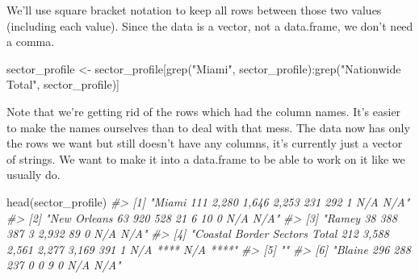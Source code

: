 \documentclass[
]{krantz}
\makeatletter
\newenvironment{Shaded}{\begin{snugshade}}{\end{snugshade}}
\newcommand{\CommentTok}[1]{\textcolor[rgb]{0.37,0.37,0.37}{\textit{#1}}}
\newcommand{\FunctionTok}[1]{\textcolor[rgb]{0,0,0}{#1}}
\newcommand{\NormalTok}[1]{#1}
\newcommand{\OtherTok}[1]{\textcolor[rgb]{0.37,0.37,0.37}{#1}}
\newcommand{\SpecialCharTok}[1]{\textcolor[rgb]{0,0,0}{#1}}
\newcommand{\StringTok}[1]{\textcolor[rgb]{0.5,0.5,0.5}{#1}}
\newenvironment{kframe}{%
\medskip{}
\setlength{\fboxsep}{.8em}
 \def\at@end@of@kframe{}%
 \ifinner\ifhmode%
  \def\at@end@of@kframe{\end{minipage}}%
  \begin{minipage}{\columnwidth}%
 \fi\fi%
 \def\FrameCommand##1{\hskip\@totalleftmargin \hskip-\fboxsep
 \colorbox{shadecolor}{##1}\hskip-\fboxsep
     \hskip-\linewidth \hskip-\@totalleftmargin \hskip\columnwidth}%
 \MakeFramed {\advance\hsize-\width
   \@totalleftmargin\z@ \linewidth\hsize
   \@setminipage}}%
 {\par\unskip\endMakeFramed%
 \at@end@of@kframe}
\renewenvironment{Shaded}{\begin{kframe}}{\end{kframe}}
\makeatother
\begin{document}
We'll use square bracket notation to keep all rows between those two values (including each value). Since the data is a vector, not a data.frame, we don't need a comma.

\begin{Shaded}
\begin{Highlighting}[]
\NormalTok{sector\_profile }\OtherTok{\textless{}{-}}\NormalTok{ sector\_profile[}\FunctionTok{grep}\NormalTok{(}\StringTok{"Miami"}\NormalTok{, sector\_profile)}\SpecialCharTok{:}\FunctionTok{grep}\NormalTok{(}\StringTok{"Nationwide Total"}\NormalTok{, sector\_profile)]}
\end{Highlighting}
\end{Shaded}

Note that we're getting rid of the rows which had the column names. It's easier to make the names ourselves than to deal with that mess. The data now has only the rows we want but still doesn't have any columns, it's currently just a vector of strings. We want to make it into a data.frame to be able to work on it like we usually do.

\begin{Shaded}
\begin{Highlighting}[]
\FunctionTok{head}\NormalTok{(sector\_profile)}
\CommentTok{\#\textgreater{} [1] "Miami                                             111              2,280                     1,646                  2,253              231               292              1              N/A      N/A"   }
\CommentTok{\#\textgreater{} [2] "New Orleans                                        63                920                      528                     21                 6               10               0              N/A      N/A"   }
\CommentTok{\#\textgreater{} [3] "Ramey                                              38               388                       387                     3               2,932              89               0           N/A         N/A"   }
\CommentTok{\#\textgreater{} [4] "Coastal Border Sectors Total                      212              3,588                     2,561                  2,277             3,169              391              1         N/A ****    N/A ****"}
\CommentTok{\#\textgreater{} [5] ""                                                                                                                                                                                                        }
\CommentTok{\#\textgreater{} [6] "Blaine                                            296                288                      237                      0                 0                9               0              N/A      N/A"}
\end{Highlighting}
\end{Shaded}
\end{document}
